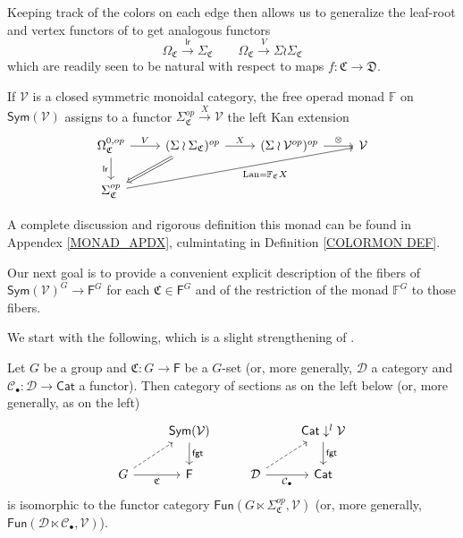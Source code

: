 \documentclass[a4paper,10pt
,draft
]{article}%
\renewcommand{\1}{\eta}%
\begin{document}
Keeping track of the colors on each edge then allows us to generalize the leaf-root and vertex functors of 
\cite{BP_geo} to get analogous functors
\[
\Omega_{\mathfrak{C}} \xrightarrow{\mathsf{lr}} \Sigma_{\mathfrak{C}}
\qquad
\Omega_{\mathfrak{C}} \xrightarrow{V} \Sigma \wr \Sigma_{\mathfrak{C}}
\]
which are readily seen to be natural with respect to maps 
$f \colon \mathfrak{C} \to \mathfrak{D}$.

If $\mathcal{V}$ is a closed symmetric monoidal category, the free operad monad $\mathbb{F}$ on $\mathsf{Sym}(\mathcal{V})$ 
assigns to a functor
$\Sigma_{\mathfrak{C}}^{op} \xrightarrow{X} \mathcal{V}$
the left Kan extension
\begin{equation}
      \label{FREEOP_EQ}
\begin{tikzcd}
	\Omega^{0,op}_{\mathfrak{C}}
	\arrow[d, "\mathsf{lr}"']
	\arrow[r, "V"]
&
	(\Sigma \wr \Sigma_{\mathfrak{C}})^{op} \arrow[r, "X"]
	\arrow[dl, Rightarrow]
&
	(\Sigma \wr \V^{op})^{op} \arrow[r, "\otimes"]
&
	\V
\\
	\Sigma^{op}_{\mathfrak{C}} \arrow[urrr, "\Lan = \mathbb F_{\mathfrak{C}} X"']
\end{tikzcd}
\end{equation}

A complete discussion and rigorous definition this monad can be found in Appendex \ref{MONAD_APDX},
culmintating in Definition \ref{COLORMON DEF}.

Our next goal is to provide a convenient explicit description of the fibers of $\mathsf{Sym}(\mathcal{V})^G \to \mathsf{F}^G$
for each $\mathfrak{C} \in \mathsf{F}^G$
and of the restriction of the monad $\mathbb{F}^G$ to those fibers.

We start with the following, which is a slight strengthening of
\cite[Lemma A.6]{BP_geo}.

\begin{lemma}\label{EQUIVFUNCONV LEM}
Let $G$ be a group and $\mathfrak{C} \colon G \to \mathsf{F}$ be a $G$-set (or, more generally, $\mathcal{D}$ a category and 
$\mathcal{C}_{\bullet}\colon \mathcal{D} \to \mathsf{Cat}$ a functor). Then category of sections as on the left below (or, more generally, as on the left)
\begin{equation}
	\begin{tikzcd}
		&
		\mathsf{Sym}(\mathcal{V}) \arrow{d}{\mathsf{fgt}}
&
		&
		\mathsf{Cat}\downarrow^l \mathcal{V} \arrow{d}{\mathsf{fgt}}
\\
		G \arrow{r}[swap]{\mathfrak{C}} \arrow[dashed]{ru} &
		\mathsf{F}
&
		\mathcal{D} \arrow{r}[swap]{\mathcal{C}_{\bullet}} \arrow[dashed]{ru} &
		\mathsf{Cat}
	\end{tikzcd}
\end{equation}
is isomorphic to the functor category
$\mathsf{Fun}(G\ltimes \Sigma_{\mathfrak{C}}^{op},\mathcal{V})$
(or, more generally, $\mathsf{Fun}(\mathcal{D} \ltimes \mathcal{C}_{\bullet},\mathcal{V})$).
\end{lemma}
\end{document}
